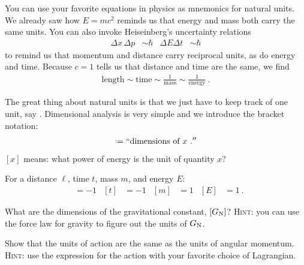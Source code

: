 \documentclass[12pt, oneside]{report}    %
\begin{document}
\begin{example}[Mnemonics]
You can use your favorite equations in physics as mnemonics for natural units. We already saw how $E=mc^2$ reminds us that energy and mass both carry the same units. You can also invoke Heiseinberg's uncertainty relations
\begin{align}
    \Delta x\,\Delta p &\sim \hbar 
    &
    \Delta E \Delta t &\sim \hbar
\end{align}
to remind us that momentum and distance carry reciprocal units, as do energy and time. Because $c=1$ tells us that distance and time are the same, we find
\begin{align}
    \text{length} \sim \text{time} \sim \frac{1}{\text{mass}} 
    \sim \frac{1}{\text{energy}} \ .
\end{align}
\end{example}

The great thing about natural units is that we just have to keep track of one unit, say \GeV{}. Dimensional analysis is very simple and we introduce the bracket notation:
\begin{align}
    [x] \defeq ``\text{dimensions of }x \ .''
\end{align}
$[x]$ means: what power of energy is the unit of quantity $x$?
\begin{example}
For a distance $\ell$, time $t$, mass $m$, and energy $E$:
\begin{align}
    [\ell] &= -1
    &
    [t] &= -1
    &
    [m] &= 1
    &
    [E] &= 1
    \ .
\end{align}
\end{example}
\begin{exercise}
What are the dimensions of the gravitational constant, $[G_\textnormal{N}]$? \textsc{Hint}: you can use the force law for gravity to figure out the  units of $G_\textnormal{N}$.
\end{exercise}

\begin{exercise}
Show that the units of action are the same as the units of angular momentum. \textsc{Hint}: use the expression for the action with your favorite choice of Lagrangian.
\end{exercise}
\end{document}
